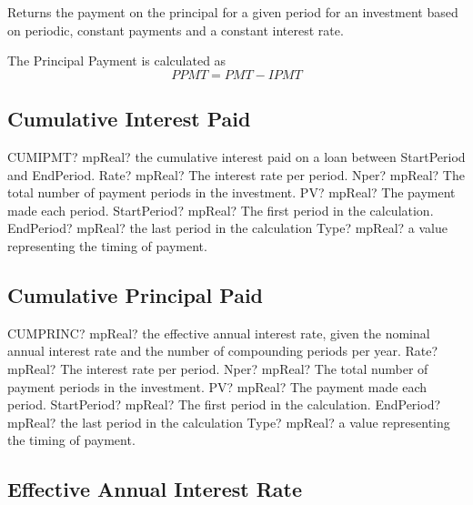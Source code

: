 \vspace{0.3cm}
Returns the payment on the principal for a given period for an investment based on periodic, constant payments and a constant interest rate.

The Principal Payment is calculated as
\begin{equation}
PPMT = PMT - IPMT 
\end{equation}




\subsection{Cumulative Interest Paid}

\begin{mpFunctionsExtract}
	\mpWorksheetFunctionSixNotImplemented
	{CUMIPMT? mpReal? the cumulative interest paid on a loan between StartPeriod and EndPeriod.}
	{Rate? mpReal? The interest rate per period.}
	{Nper? mpReal? The total number of payment periods in the investment.}
	{PV? mpReal? The payment made each period.}
	{StartPeriod? mpReal? The first period in the calculation.}
	{EndPeriod? mpReal? the last period in the calculation}
	{Type? mpReal? a value representing the timing of payment.}
\end{mpFunctionsExtract}





\subsection{Cumulative Principal Paid}

\begin{mpFunctionsExtract}
	\mpWorksheetFunctionSixNotImplemented
	{CUMPRINC? mpReal? the effective annual interest rate, given the nominal annual interest rate and the number of compounding periods per year.}
	{Rate? mpReal? The interest rate per period.}
	{Nper? mpReal? The total number of payment periods in the investment.}
	{PV? mpReal? The payment made each period.}
	{StartPeriod? mpReal? The first period in the calculation.}
	{EndPeriod? mpReal? the last period in the calculation}
	{Type? mpReal? a value representing the timing of payment.}
\end{mpFunctionsExtract}




\subsection{Effective Annual Interest Rate}

